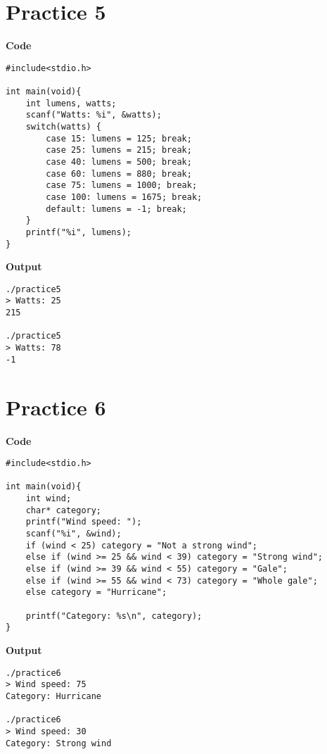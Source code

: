 \documentclass[a4paper, 10pt]{article}
\begin{document}
    \section*{Practice 5}
    \begin{minipage}[t]{0.55\textwidth}
        \large \textbf{Code}
        \begin{lstlisting}[style=code]
#include<stdio.h>

int main(void){
    int lumens, watts;
    scanf("Watts: %i", &watts);
    switch(watts) {
        case 15: lumens = 125; break;
        case 25: lumens = 215; break;
        case 40: lumens = 500; break;
        case 60: lumens = 880; break;
        case 75: lumens = 1000; break;
        case 100: lumens = 1675; break;
        default: lumens = -1; break;
    }
    printf("%i", lumens);
}
        \end{lstlisting}
    \end{minipage}
    \hspace{0.5cm}
    \begin{minipage}[t]{0.4\textwidth}
        \large \textbf{Output}
        \begin{lstlisting}[style=output]
./practice5
> Watts: 25
215

./practice5
> Watts: 78
-1
        \end{lstlisting}
    \end{minipage}

    \section*{Practice 6}
    \begin{minipage}[t]{0.55\textwidth}
        \large \textbf{Code}
        \begin{lstlisting}[style=code]
#include<stdio.h>

int main(void){
    int wind;
    char* category;
    printf("Wind speed: ");
    scanf("%i", &wind);
    if (wind < 25) category = "Not a strong wind";
    else if (wind >= 25 && wind < 39) category = "Strong wind";
    else if (wind >= 39 && wind < 55) category = "Gale";
    else if (wind >= 55 && wind < 73) category = "Whole gale";
    else category = "Hurricane";

    printf("Category: %s\n", category);
}
        \end{lstlisting}
    \end{minipage}
    \hspace{0.5cm}
    \begin{minipage}[t]{0.4\textwidth}
        \large \textbf{Output}
        \begin{lstlisting}[style=output]
./practice6
> Wind speed: 75
Category: Hurricane

./practice6
> Wind speed: 30
Category: Strong wind
        \end{lstlisting}
    \end{minipage}
\end{document}

